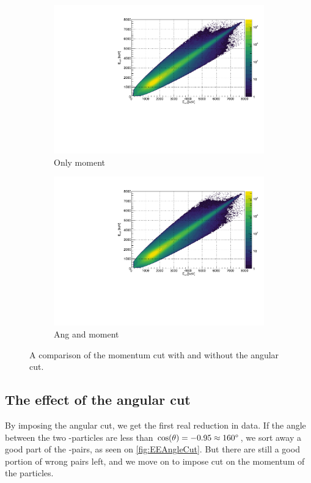 \begin{figure}[H]
	\begin{subfigure}[t]{0.5\linewidth}
		\includegraphics[width=\linewidth]{../figures/EEMomentumCut.pdf}
		\caption{Only moment}
	\end{subfigure}
	\begin{subfigure}[t]{0.5\linewidth}
		\includegraphics[width=\linewidth]{../figures/EEAngAndMoment.pdf}
		\caption{Ang and moment}
	\end{subfigure}
\caption{A comparison of the momentum cut with and without the angular cut.}
\label{fig:AngAndMomentCompare}
\end{figure}

\subsection{The effect of the angular cut}
By imposing the angular cut, we get the first real reduction in data. If the angle between the two \al-particles are less than $\cos(\theta) = -0.95 \approx 160\degree$, we sort away a good part of the \be-\al pairs, as seen on \cref{fig:EEAngleCut}. But there are still a good portion of wrong pairs left, and we move on to impose cut on the momentum of the particles. 


